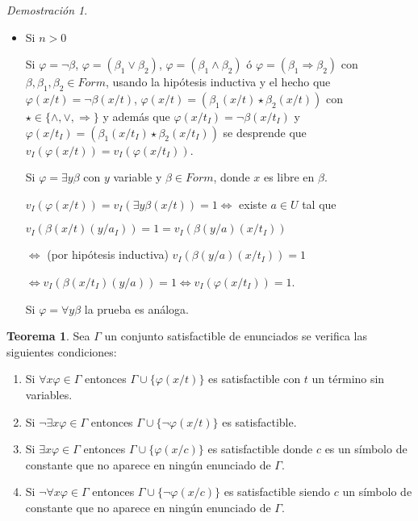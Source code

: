 \documentclass[a4paper,11pt]{article}
\theoremstyle{definition}
\newtheorem{teor}{Teorema}[section]
\theoremstyle{remark}
\newtheorem*{demo}{Demostración}
\begin{document}
\begin{demo}
\begin{itemize}
        \item Si $n > 0$
    
        Si $\varphi = \lnot \beta$, $\varphi = (\beta_1 \lor \beta_2)$,
        $\varphi = (\beta_1 \land \beta_2)$ ó $\varphi = (\beta_1 \Rightarrow \beta_2)$
        con $\beta, \beta_1, \beta_2 \in Form$, usando la hipótesis
        inductiva y el hecho que $\varphi(x/t) = \lnot \beta(x/t)$,
        $\varphi(x/t) = (\beta_1(x/t) \star \beta_2(x/t))$ con 
        $\star \in \{\land, \lor, \Rightarrow\}$ y además que
        $\varphi(x/t_I) = \lnot \beta(x/t_I)$ y 
        $\varphi(x/t_I) = (\beta_1(x/t_I) \star \beta_2(x/t_I))$
        se desprende que $v_I(\varphi(x/t)) = v_I(\varphi(x/t_I))$.
        
        Si $\varphi = \exists y \beta$ con $y$ variable y $\beta \in Form$,
        donde $x$ es libre en $\beta$.
        
        $v_I(\varphi(x/t)) = v_I(\exists y \beta(x/t)) = 1 \iff$ 
        existe $a \in U$ tal que 
        
        $v_I(\beta(x/t)(y/a_I)) = 1 = v_I(\beta(y/a)(x/t_I))$
        
        $\iff$ (por hipótesis inductiva) $v_I(\beta(y/a)(x/t_I)) = 1$
        
        $\iff v_I(\beta(x/t_I)(y/a)) = 1 \iff v_I(\varphi(x/t_I)) = 1$.
        
        Si $\varphi = \forall y \beta$ la prueba es análoga.
    \end{itemize}
\end{demo}

\begin{teor}
    Sea $\Gamma$ un conjunto satisfactible de enunciados se verifica
    las siguientes condiciones:
    
    \begin{enumerate}
        \item Si $\forall x \varphi \in  \Gamma$ entonces 
        $\Gamma \cup \{ \varphi(x/t) \}$ es satisfactible con $t$ 
        un término sin variables.
        
        \item Si $\lnot \exists x \varphi \in \Gamma$ entonces
        $\Gamma \cup \{ \lnot \varphi(x/t) \}$ es satisfactible.
        
        \item Si $\exists x \varphi \in \Gamma$ entonces 
        $\Gamma \cup \{ \varphi(x/c) \}$ es satisfactible donde $c$
        es un símbolo de constante que no aparece en ningún enunciado de
        $\Gamma$.
        
        \item Si $\lnot \forall x \varphi \in \Gamma$ entonces 
        $\Gamma \cup \{ \lnot \varphi(x/c) \}$ es satisfactible
        siendo $c$ un símbolo de constante que no aparece en
        ningún enunciado de $\Gamma$.
    \end{enumerate}
\end{teor}
\end{document}
